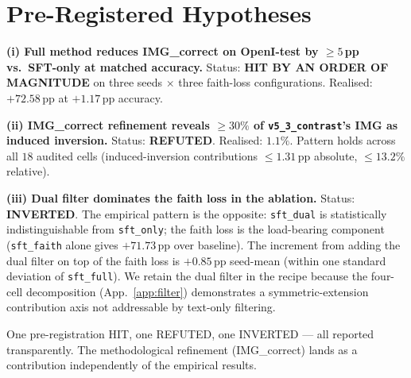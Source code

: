 \documentclass{article}
\begin{document}
\section{Pre-Registered Hypotheses}
\label{app:prereg}

\textbf{(i) Full method reduces IMG\_correct on OpenI-test by
$\geq 5$\,pp vs.\ SFT-only at matched accuracy.} Status:
\textbf{HIT BY AN ORDER OF MAGNITUDE} on three seeds $\times$ three
faith-loss configurations. Realised: $+72.58$\,pp at $+1.17$\,pp
accuracy.

\textbf{(ii) IMG\_correct refinement reveals $\geq 30\%$ of
\texttt{v5\_3\_contrast}'s IMG as induced inversion.} Status:
\textbf{REFUTED}. Realised: $1.1\%$. Pattern holds across all $18$
audited cells (induced-inversion contributions $\leq 1.31$\,pp
absolute, $\leq 13.2\%$ relative).

\textbf{(iii) Dual filter dominates the faith loss in the ablation.}
Status: \textbf{INVERTED}. The empirical pattern is the opposite:
\texttt{sft\_dual} is statistically indistinguishable from
\texttt{sft\_only}; the faith loss is the load-bearing component
(\texttt{sft\_faith} alone gives $+71.73$\,pp over baseline). The
increment from adding the dual filter on top of the faith loss is
$+0.85$\,pp seed-mean (within one standard deviation of
\texttt{sft\_full}). We retain the dual filter in the recipe because
the four-cell decomposition (App.~\ref{app:filter}) demonstrates a
symmetric-extension contribution axis not addressable by text-only
filtering.

One pre-registration HIT, one REFUTED, one INVERTED --- all reported
transparently. The methodological refinement (IMG\_correct) lands as a
contribution independently of the empirical results.



\end{document}
